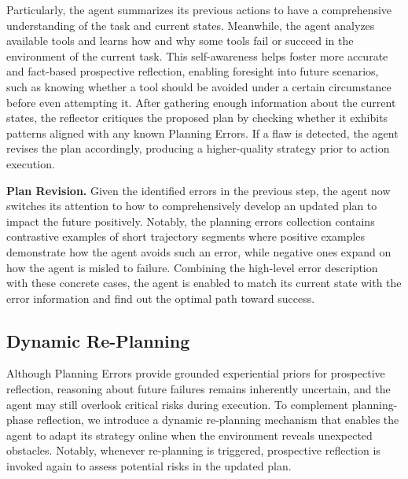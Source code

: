 Particularly, the agent summarizes its previous actions to have a comprehensive understanding of the task and current states. Meanwhile, the agent analyzes available tools and learns how and why some tools fail or succeed in the environment of the current task.
This self-awareness helps foster more accurate and fact-based prospective reflection, enabling foresight into future scenarios, such as knowing whether a tool should be avoided under a certain circumstance before even attempting it. After gathering enough information about the current states, the reflector critiques the proposed plan by checking whether it exhibits patterns aligned with any known Planning Errors. If a flaw is detected, the agent revises the plan accordingly, producing a higher-quality strategy prior to action execution.



\noindent\textbf{Plan Revision.} Given the identified errors in the previous step, the agent now switches its attention to how to comprehensively develop an updated plan to impact the future positively. Notably, the planning errors collection contains contrastive examples of short trajectory segments where positive examples demonstrate how the agent avoids such an error, while negative ones expand on how the agent is misled to failure. Combining the high-level error description with these concrete cases, the agent is enabled to match its current state with the error information and find out the optimal path toward success.


 
\subsection{Dynamic Re-Planning}
\label{subsec:arp}
Although Planning Errors provide grounded experiential priors for prospective reflection, reasoning about future failures remains inherently uncertain, and the agent may still overlook critical risks during execution. To complement planning-phase reflection, we introduce a dynamic re-planning mechanism that enables the agent to adapt its strategy online when the environment reveals unexpected obstacles. Notably, whenever re-planning is triggered, prospective reflection is invoked again to assess potential risks in the updated plan.



